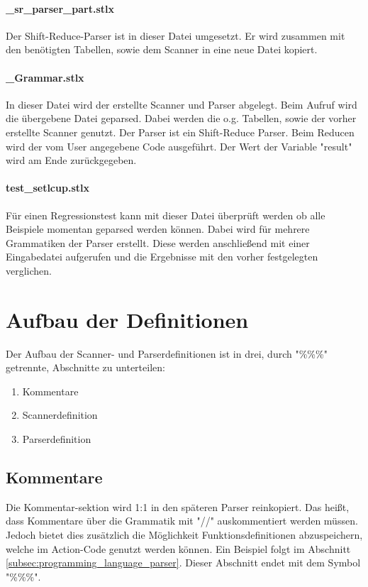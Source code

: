 \paragraph{\_sr\_parser\_part.stlx} Der Shift-Reduce-Parser ist in dieser Datei umgesetzt. Er wird zusammen mit den benötigten Tabellen, sowie dem Scanner in eine neue Datei kopiert. 
\paragraph{\_Grammar.stlx} In dieser Datei wird der erstellte Scanner und Parser abgelegt. Beim Aufruf wird die übergebene Datei geparsed. Dabei werden die o.g. Tabellen, sowie der vorher erstellte Scanner genutzt. Der Parser ist ein Shift-Reduce Parser. Beim Reducen wird der vom User angegebene Code ausgeführt. Der Wert der Variable "result" wird am Ende zurückgegeben.
\paragraph{test\_setlcup.stlx} Für einen Regressionstest kann mit dieser Datei überprüft werden ob alle Beispiele momentan geparsed werden können. Dabei wird für mehrere Grammatiken der Parser erstellt. Diese werden anschließend mit einer Eingabedatei aufgerufen und die Ergebnisse mit den vorher festgelegten verglichen.
\section{Aufbau der Definitionen}

Der Aufbau der Scanner- und Parserdefinitionen ist in drei, durch "\%\%\%" getrennte, Abschnitte zu unterteilen:
\begin{enumerate}
	\item Kommentare
	\item Scannerdefinition
	\item Parserdefinition
\end{enumerate}
\subsection{Kommentare}
Die Kommentar-sektion wird 1:1 in den späteren Parser reinkopiert.
Das heißt, dass Kommentare über die Grammatik mit "//" auskommentiert werden müssen.
Jedoch bietet dies zusätzlich die Möglichkeit Funktionsdefinitionen abzuspeichern, welche im Action-Code genutzt werden können. Ein Beispiel folgt im Abschnitt \ref{subsec:programming_language_parser}. 
Dieser Abschnitt endet mit dem Symbol "\%\%\%". 
